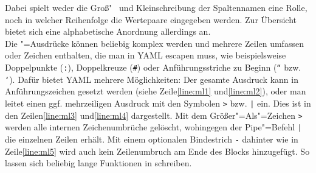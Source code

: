 Dabei spielt weder die Groß"~ und Kleinschreibung der Spaltennamen eine Rolle, noch in welcher Reihenfolge die Wertepaare eingegeben werden. Zur Übersicht bietet sich eine alphabetische Anordnung allerdings an. \\
Die "=Ausdrücke können beliebig komplex werden und mehrere Zeilen umfassen oder Zeichen enthalten, die man in YAML escapen muss, wie beispielsweise Doppelpunkte (\texttt{:}), Doppelkreuze (\texttt{\#}) oder Anführungsstriche zu Beginn (\texttt{``} bzw. \texttt{`}). Dafür bietet YAML mehrere Möglichkeiten: Der gesamte Ausdruck kann in Anführungszeichen gesetzt werden (siehe Zeile\nbs\ref{line:ml1} und\nbs\ref{line:ml2}), oder man leitet einen ggf. mehrzeiligen Ausdruck mit den Symbolen \texttt{>} bzw. \texttt{|} ein. Dies ist in den Zeilen\nbs\ref{line:ml3} und\nbs\ref{line:ml4} dargestellt. Mit dem Größer"=Als"=Zeichen \texttt{>} werden alle internen Zeichenumbrüche gelöscht, wohingegen der Pipe"=Befehl \texttt{|} die einzelnen Zeilen erhält. Mit einem optionalen Bindestrich \texttt{-} dahinter wie in Zeile\nbs\ref{line:ml5} wird auch kein Zeilenumbruch am Ende des Blocks hinzugefügt. So lassen sich beliebig lange Funktionen in  schreiben. 

